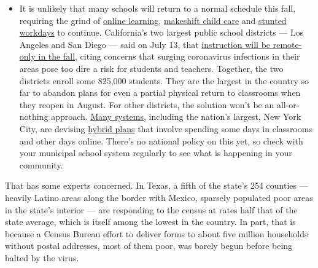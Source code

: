 \begin{itemize}
  \begin{itemize}
  \tightlist
  \item
    It is unlikely that many schools will return to a normal schedule
    this fall, requiring the grind of
    \href{https://www.nytimes.com/2020/06/05/us/coronavirus-education-lost-learning.html?action=click\&pgtype=Article\&state=default\&region=MAIN_CONTENT_3\&context=storylines_faq}{online
    learning},
    \href{https://www.nytimes.com/2020/05/29/us/coronavirus-child-care-centers.html?action=click\&pgtype=Article\&state=default\&region=MAIN_CONTENT_3\&context=storylines_faq}{makeshift
    child care} and
    \href{https://www.nytimes.com/2020/06/03/business/economy/coronavirus-working-women.html?action=click\&pgtype=Article\&state=default\&region=MAIN_CONTENT_3\&context=storylines_faq}{stunted
    workdays} to continue. California's two largest public school
    districts --- Los Angeles and San Diego --- said on July 13, that
    \href{https://www.nytimes.com/2020/07/13/us/lausd-san-diego-school-reopening.html?action=click\&pgtype=Article\&state=default\&region=MAIN_CONTENT_3\&context=storylines_faq}{instruction
    will be remote-only in the fall}, citing concerns that surging
    coronavirus infections in their areas pose too dire a risk for
    students and teachers. Together, the two districts enroll some
    825,000 students. They are the largest in the country so far to
    abandon plans for even a partial physical return to classrooms when
    they reopen in August. For other districts, the solution won't be an
    all-or-nothing approach.
    \href{https://bioethics.jhu.edu/research-and-outreach/projects/eschool-initiative/school-policy-tracker/}{Many
    systems}, including the nation's largest, New York City, are
    devising
    \href{https://www.nytimes.com/2020/06/26/us/coronavirus-schools-reopen-fall.html?action=click\&pgtype=Article\&state=default\&region=MAIN_CONTENT_3\&context=storylines_faq}{hybrid
    plans} that involve spending some days in classrooms and other days
    online. There's no national policy on this yet, so check with your
    municipal school system regularly to see what is happening in your
    community.
  \end{itemize}
\end{itemize}

That has some experts concerned. In Texas, a fifth of the state's 254
counties --- heavily Latino areas along the border with Mexico, sparsely
populated poor areas in the state's interior --- are responding to the
census at rates half that of the state average, which is itself among
the lowest in the country. In part, that is because a Census Bureau
effort to deliver forms to about five million households without postal
addresses, most of them poor, was barely begun before being halted by
the virus.

